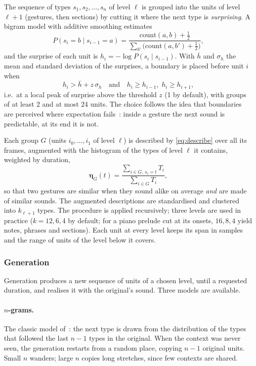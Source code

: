 \documentclass[11pt,a4paper]{article}
\begin{document}
The sequence of types $s_1, s_2, \dots, s_n$ of level $\ell$ is grouped into
the units of level $\ell+1$ (gestures, then sections) by cutting it where the
next type is \emph{surprising}. A bigram model with additive smoothing
estimates
\begin{equation}
  P(s_i = b \mid s_{i-1} = a) = \frac{\mathrm{count}(a, b) + \tfrac12}{\sum_{b'} \bigl(\mathrm{count}(a, b') + \tfrac12\bigr)},
\end{equation}
and the surprise of each unit is $h_i = -\log P(s_i \mid s_{i-1})$. With
$\bar h$ and $\sigma_h$ the mean and standard deviation of the surprises, a
boundary is placed before unit $i$ when
\begin{equation}
  h_i > \bar h + z\, \sigma_h \quad \text{and} \quad h_i \ge h_{i-1},\; h_i \ge h_{i+1},
\end{equation}
i.e.\ at a local peak of surprise above the threshold $z$ (1 by default), with
groups of at least 2 and at most 24 units. The choice follows the idea that
boundaries are perceived where expectation fails~\cite{abdallah2009,pearce2010}:
inside a gesture the next sound is predictable, at its end it is not.

Each group $G$ (units $i_0, \dots, i_1$ of level $\ell$) is described by
\eqref{eq:describe} over all its frames, augmented with the histogram of the
types of level $\ell$ it contains, weighted by duration,
\begin{equation}
  \bm{\eta}_G(t) = \frac{\sum_{i \in G,\, s_i = t} T_i}{\sum_{i \in G} T_i},
\end{equation}
so that two gestures are similar when they sound alike on average
\emph{and} are made of similar sounds. The augmented descriptions are
standardised and clustered into $k_{\ell+1}$ types. The procedure is applied
recursively; three levels are used in practice ($k = 12, 6, 4$ by default;
for a piano prelude cut at its onsets, $16, 8, 4$ yield notes, phrases and
sections). Each unit at every level keeps its span in samples and the range
of units of the level below it covers.

\subsubsection{Generation}

Generation produces a new sequence of units of a chosen level, until a
requested duration, and realises it with the original's sound. Three models
are available.

\paragraph{$n$-grams.} The classic model of~\cite{cella2011soundtypes}: the
next type is drawn from the distribution of the types that followed the last
$n-1$ types in the original. When the context was never seen, the
generation restarts from a random place, copying $n-1$ original units.
Small $n$ wanders; large $n$ copies long stretches, since few contexts are
shared.
\end{document}
